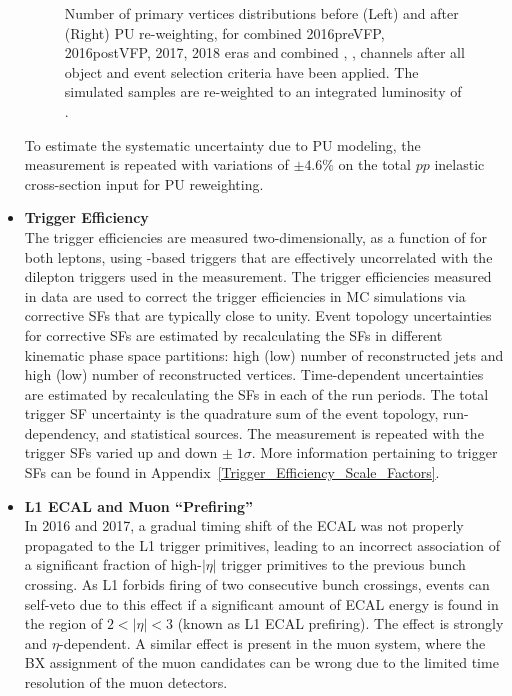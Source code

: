 \begin{itemize}
\begin{figure}[htb]
\begin{center}
\begin{tabular}{cc}
        \end{tabular}
        \caption{\footnotesize Number of primary vertices distributions before (Left) and after (Right) PU re-weighting, for combined 2016preVFP, 2016postVFP, 2017, 2018 eras and combined \ee, \emu, \mumu channels after all object and event selection criteria have been applied.
        The simulated samples are re-weighted to an integrated luminosity of \lumivalueRuniiUL.
        \label{PU_re-weighting}
        }
    \end{center}
\end{figure}
    To estimate the systematic uncertainty due to PU modeling, the measurement is repeated with variations of $\pm 4.6\%$ on the total $pp$ inelastic cross-section input for PU reweighting.
    \item {\bf Trigger Efficiency} \\
    The trigger efficiencies are measured two-dimensionally, as a function of \pT for both leptons, using \ETmiss-based triggers that are effectively uncorrelated with the dilepton triggers used in the measurement. 
    The trigger efficiencies measured in data are used to correct the trigger efficiencies in MC simulations via corrective SFs that are typically close to unity. 
    Event topology uncertainties for corrective SFs are estimated by recalculating the SFs in different kinematic phase space partitions: high (low) number of reconstructed jets and high (low) number of reconstructed vertices.
    Time-dependent uncertainties are estimated by recalculating the SFs in each of the run periods.
    The total trigger SF uncertainty is the quadrature sum of the event topology, run-dependency, and statistical sources.
    The measurement is repeated with the trigger SFs varied up and down $\pm \; 1 \sigma$.
    More information pertaining to trigger SFs can be found in Appendix~\ref{Trigger_Efficiency_Scale_Factors}.
    \item {\bf L1 ECAL and Muon ``Prefiring''} \\
    In 2016 and 2017, a gradual timing shift of the ECAL was not properly propagated to the L1 trigger primitives, leading to an incorrect association of a significant fraction of high-$\vert \eta \vert$ trigger primitives to the previous bunch crossing.
    As L1 forbids firing of two consecutive bunch crossings, events can self-veto due to this effect if a significant amount of ECAL energy is found in the region of $2<\vert \eta \vert<3$ (known as L1 ECAL prefiring).
    The effect is strongly \pT and $\eta$-dependent.
    A similar effect is present in the muon system, where the BX assignment of the muon candidates can be wrong due to the limited time resolution of the muon detectors. 

\end{itemize}
